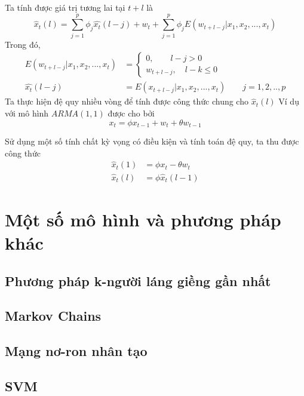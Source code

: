 \documentclass[twoside,12pt]{Latex/Classes/PhDthesisPSnPDF}
\begin{document}
Ta tính được giá trị tương lai tại $t+l$ là 
\begin{equation}
	 \hat{x}_t(l) = \sum\limits_{j=1}^p\phi_j\hat{x_t}(l-j) + w_t + \sum\limits_{j=1}^p\phi_jE(w_{t+l-j}|x_1,x_2,...,x_t)
\end{equation}   
Trong đó,
\begin{align}
E(w_{t+l-j}|x_1,x_2,...,x_t) &= \begin{cases}
									0, \qquad l-j > 0\\
									w_{t+l-j}, \quad l-k \leq 0
								\end {cases}\\
\hat{x_t}(l-j) &= E(x_{t+l-j}|x_1,x_2,...,x_t)\qquad j = 1,2,..,p
\end{align}
 Ta thực hiện đệ quy nhiều vòng để tính được công thức chung cho $\hat{x}_t(l)$
Ví dụ với mô hình $ARMA(1,1)$ được cho bởi
\begin{equation}
	x_t = \phi{x_{t-1}}+w_t + \theta{w_{t-1}}
\end{equation}

Sử dụng một số tính chất kỳ vọng có điều kiện và tính toán đệ quy, ta thu được công thức
\begin{align}
	\hat{x}_t(1) &= \phi{x_t} - \theta{w_t} \\
	\hat{x}_t(l) &= \phi\hat{x}_t(l-1)
\end{align}
\section{Một số mô hình và phương pháp khác}
\subsection{Phương pháp k-người láng giềng gần nhất}
\subsection{Markov Chains}
\subsection{Mạng nơ-ron nhân tạo}
\subsection{SVM}

\cite{m85}
\cite{tsa2}


\renewcommand{\bibname}{Tham khảo} %

\end{document}
